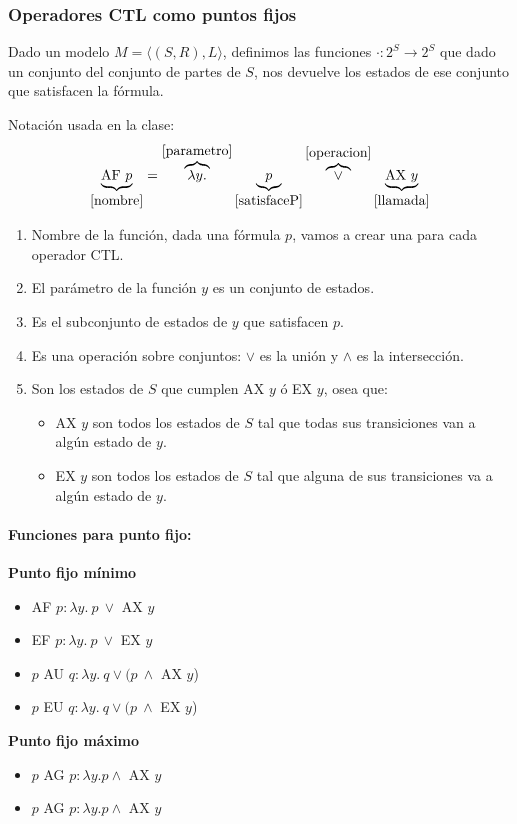 \subsubsection{Operadores CTL como puntos fijos}
Dado un modelo $M=\langle(S,R), L\rangle$, definimos las funciones $\cdot:2^S\to 2^S$ que dado un conjunto del conjunto de partes de $S$, nos devuelve los estados de ese conjunto que satisfacen la fórmula. 

Notación usada en la clase: $$\underbrace{\text{AF } p}_{\ref{nombre}} = \overbrace{\lambda y.}^{\ref{parametro}} \underbrace{p}_{\ref{satisfaceP}}\overbrace{\lor }^{\ref{operacion}}\underbrace{\text{AX } y}_{\ref{llamada}}$$


\begin{enumerate}[label={(}\arabic*{)}]
\item\label{nombre} Nombre de la función, dada una fórmula $p$, vamos a crear una para cada operador CTL.
\item\label{parametro} El parámetro de la función $y$ es un conjunto de estados. 
\item\label{satisfaceP} Es el subconjunto de estados de $y$ que satisfacen $p$. 
\item\label{operacion} Es una operación sobre conjuntos: $\lor$ es la unión y $\land$ es la intersección. 
\item\label{llamada} Son los estados de $S$ que cumplen AX $y$ ó EX $y$, osea que:
\begin{itemize}
\item AX $y$ son todos los estados de $S$ tal que todas sus transiciones van a algún estado de $y$.
\item EX $y$ son todos los estados de $S$ tal que alguna de sus transiciones va a algún estado de $y$.
\end{itemize}
\end{enumerate}

\paragraph{Funciones para punto fijo:}
\begin{itemize}
\begin{multicols}{2}
\item[] \textbf{Punto fijo mínimo}
\begin{itemize}
\item AF $p : \lambda y.~p~\lor$ AX $y$
\item EF $p : \lambda y. ~p~\lor$ EX $y$
\item $p$ AU $q: \lambda y.~ q \lor (p~\land$ AX $y$)
\item $p$ EU $q: \lambda y.~ q \lor (p~\land$ EX $y$)
\end{itemize}
\columnbreak
\item[] \textbf{Punto fijo máximo}
\begin{itemize}
\item $p$ AG $p: \lambda y. p \land$ AX $y$
\item $p$ AG $p: \lambda y. p \land$ AX $y$
\end{itemize}
\vfill\null
\end{multicols}
\end{itemize}

